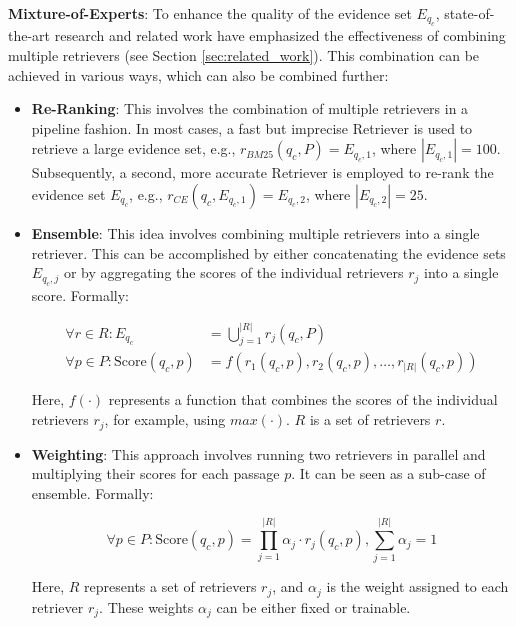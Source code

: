 \vspace{\baselineskip}

\textbf{Mixture-of-Experts}: To enhance the quality of the evidence set $E_{q_c}$, state-of-the-art research and related work have emphasized the effectiveness of combining multiple retrievers (see Section \ref{sec:related_work}). This combination can be achieved in various ways, which can also be combined further:

\begin{itemize}
    \item \textbf{Re-Ranking}: This involves the combination of multiple retrievers in a pipeline fashion. In most cases, a fast but imprecise Retriever is used to retrieve a large evidence set, e.g., $r_{BM25}(q_c,P) = E_{q_c,1}$, where $|E_{q_c,1}| = 100$. Subsequently, a second, more accurate Retriever is employed to re-rank the evidence set $E_{q_c}$, e.g., $r_{CE}(q_c,E_{q_c,1}) = E_{q_c,2}$, where $|E_{q_c,2}| = 25$.
    
    \item \textbf{Ensemble}: This idea involves combining multiple retrievers into a single retriever. This can be accomplished by either concatenating the evidence sets $E_{q_c,j}$ or by aggregating the scores of the individual retrievers $r_j$ into a single score. Formally:
    
    \begin{align}
        \forall r \in R: E_{q_c} &= \bigcup_{j=1}^{|R|} r_j(q_c, P) \\
        \forall p \in P: \text{Score}(q_c, p) &= f(r_1(q_c, p), r_2(q_c, p), \dots, r_{|R|}(q_c, p))
    \end{align}
    
    Here, $f(\cdot)$ represents a function that combines the scores of the individual retrievers $r_j$, for example, using $max(\cdot)$. $R$ is a set of retrievers $r$.
    
    \item \textbf{Weighting}: This approach involves running two retrievers in parallel and multiplying their scores for each passage $p$. It can be seen as a sub-case of ensemble. Formally:
    
    \begin{equation}
        \forall p \in P: \text{Score}(q_c, p) = \prod_{j=1}^{|R|} \alpha_j \cdot r_j(q_c, p), \sum_{j=1}^{|R|} \alpha_j = 1
    \end{equation}
    
    Here, $R$ represents a set of retrievers $r_j$, and $\alpha_j$ is the weight assigned to each retriever $r_j$. These weights $\alpha_j$ can be either fixed or trainable.
\end{itemize}

